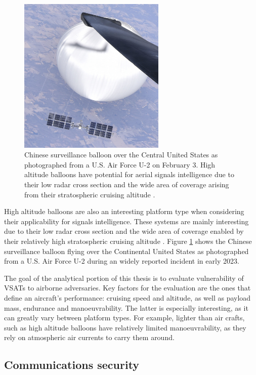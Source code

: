 \documentclass[english, 12pt, a4paper, elec, utf8, a-1b, online]{aaltothesis}
\begin{document}
\begin{figure}[h]
  \centering
  \includegraphics[width=70mm]{figures/U-2_Pilot_over_Central_Continental_United_States_(7644960)_(cropped).jpg}
  \caption{Chinese surveillance balloon over the Central United States as photographed from a U.S. Air Force U-2 on February 3. High altitude balloons have potential for aerial signals intelligence due to their low radar cross section and the wide area of coverage arising from their stratospheric cruising altitude \cite{tomme2005paradigm}.}
  \label{fig-chinese-balloon}
\end{figure}

High altitude balloons are also an interesting platform type when considering their applicability for signals intelligence. These systems are mainly interesting due to their low radar cross section and the wide area of coverage enabled by their relatively high stratospheric cruising altitude \cite{tomme2005paradigm}.
Figure \ref{fig-chinese-balloon} shows the Chinese surveillance balloon flying over the Continental United States as photographed from a U.S. Air Force U-2 during an widely reported incident in early 2023.

The goal of the analytical portion of this thesis is to evaluate vulnerability of VSATs to airborne adversaries.
Key factors for the evaluation are the ones that define an aircraft's performance: cruising speed and altitude, as well as payload mass, endurance and manoeuvrability.
The latter is especially interesting, as it can greatly vary between platform types.
For example, lighter than air crafts, such as high altitude balloons have relatively limited manoeuvrability, as they rely on atmospheric air currents to carry them around.

\subsection{Communications security}
\end{document}
